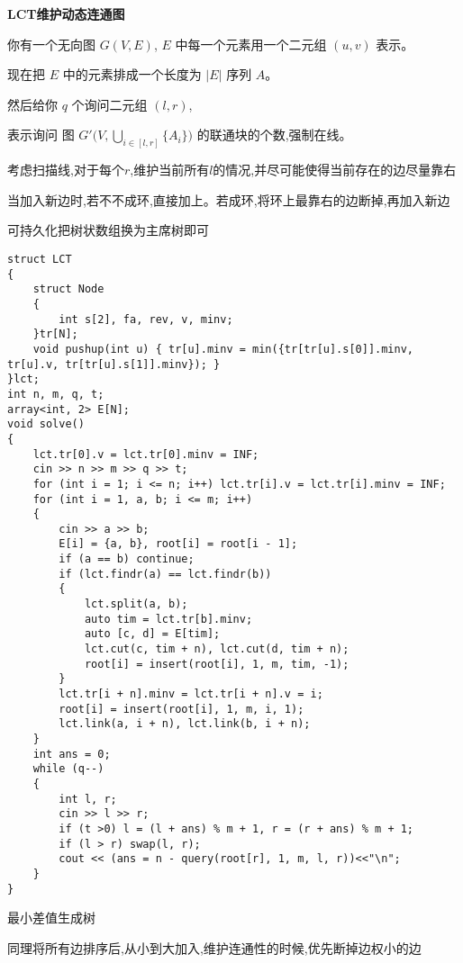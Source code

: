 \documentclass[a4paper, fontset=none]{ctexart}
\begin{document}
\textbf{LCT维护动态连通图}

你有一个无向图 $G( V, E )$, $E$ 中每一个元素用一个二元组 $( u, v )$ 表示。

现在把 $E$ 中的元素排成一个长度为 $|E|$ 序列 $A$。

然后给你 $q$ 个询问二元组 $( l, r )$,

表示询问 图 $ G'\big( V, \mathop{\bigcup}\limits_{ i \in [l, r] } \{A_i\} \big) $ 的联通块的个数,强制在线。

考虑扫描线,对于每个$r$,维护当前所有$l$的情况,并尽可能使得当前存在的边尽量靠右

当加入新边时,若不不成环,直接加上。若成环,将环上最靠右的边断掉,再加入新边

可持久化把树状数组换为主席树即可

\begin{verbatim}
struct LCT
{
    struct Node
    {
        int s[2], fa, rev, v, minv;
    }tr[N];
    void pushup(int u) { tr[u].minv = min({tr[tr[u].s[0]].minv, tr[u].v, tr[tr[u].s[1]].minv}); }
}lct;
int n, m, q, t;
array<int, 2> E[N];
void solve()
{
    lct.tr[0].v = lct.tr[0].minv = INF;
    cin >> n >> m >> q >> t;
    for (int i = 1; i <= n; i++) lct.tr[i].v = lct.tr[i].minv = INF;
    for (int i = 1, a, b; i <= m; i++)
    {
        cin >> a >> b;
        E[i] = {a, b}, root[i] = root[i - 1];
        if (a == b) continue;
        if (lct.findr(a) == lct.findr(b))
        {
            lct.split(a, b);
            auto tim = lct.tr[b].minv;
            auto [c, d] = E[tim];
            lct.cut(c, tim + n), lct.cut(d, tim + n);
            root[i] = insert(root[i], 1, m, tim, -1);
        }
        lct.tr[i + n].minv = lct.tr[i + n].v = i;
        root[i] = insert(root[i], 1, m, i, 1);
        lct.link(a, i + n), lct.link(b, i + n);
    }
    int ans = 0;
    while (q--)
    {
        int l, r;
        cin >> l >> r;
        if (t >0) l = (l + ans) % m + 1, r = (r + ans) % m + 1;
        if (l > r) swap(l, r);
        cout << (ans = n - query(root[r], 1, m, l, r))<<"\n";
    }
}
\end{verbatim}

最小差值生成树

同理将所有边排序后,从小到大加入,维护连通性的时候,优先断掉边权小的边
\end{document}
